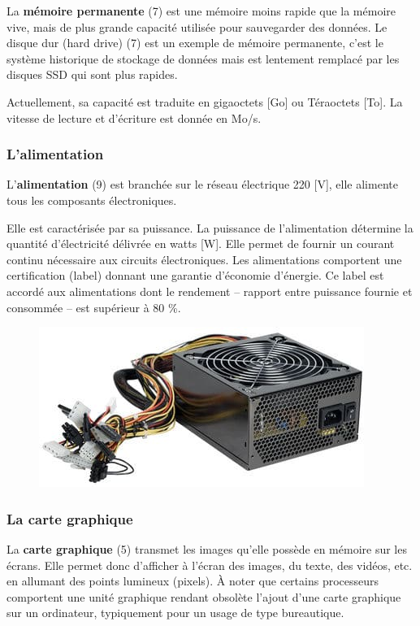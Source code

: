 \documentclass[11pt, a4paper]{book}
\begin{document}
La {\bf mémoire permanente} (7) est une mémoire moins rapide que la mémoire vive, mais de plus grande capacité utilisée pour sauvegarder des données. Le disque dur (hard drive) (7) est un exemple de mémoire permanente, c'est le système historique de stockage de données mais est lentement remplacé par les disques SSD qui sont plus rapides.

Actuellement, sa capacité est traduite en gigaoctets [Go] ou Téraoctets [To]. La vitesse de lecture et d'écriture est donnée en Mo/s.





\subsubsection{L'alimentation}

      
L'{\bf alimentation} (9) est branchée sur le réseau électrique 220 [V], elle alimente tous les composants électroniques.


Elle  est caractérisée par sa puissance. La puissance de l'alimentation détermine la quantité d'électricité délivrée en watts [W]. Elle permet de fournir un courant continu nécessaire aux circuits électroniques. Les alimentations comportent une certification (label) donnant une garantie d'économie d'énergie. Ce label est accordé aux alimentations dont le rendement – rapport entre puissance fournie et consommée – est supérieur à 80 \%.

\begin{figure}[h]
	\centering
	\includegraphics[scale=.5]{images/alimentation}

\end{figure}

\subsubsection{La carte graphique}
      

La {\bf carte graphique}  (5)  transmet les images qu'elle possède en mémoire sur les écrans. Elle permet donc d'afficher à l'écran des images, du texte, des vidéos, etc. en allumant des points lumineux (pixels). À noter que certains processeurs comportent une unité graphique rendant obsolète l'ajout d'une carte graphique sur un ordinateur, typiquement pour un usage de type bureautique.
\end{document}

